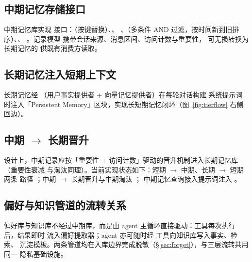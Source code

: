\subsection{中期记忆存储接口}

中期记忆库实现  接口：（按键替换）、、
、（多条件 AND 过滤，按时间新到旧排序）、、
。记录模型  携带会话来源、消息区间、访问计数与重要性，
可无损转换为长期记忆的  供既有消费方读取。

\subsection{长期记忆注入短期上下文}

长期记忆经 （用户事实提供者 + 向量记忆提供者）在每轮对话构建
系统提示词时注入「Persistent Memory」区块，实现长短期记忆闭环（图~\ref{fig:tierflow}
右侧回边）。

\subsection{中期 $\rightarrow$ 长期晋升}

设计上，中期记录应按「重要性 + 访问计数」驱动的晋升机制进入长期记忆库（重要性衰减
与淘汰同理）。当前实现状态如下：短期 $\rightarrow$ 中期、长期 $\rightarrow$ 短期两条
路径 \statusdone；中期 $\rightarrow$ 长期晋升与中期淘汰 ；
中期记忆查询接入提示词注入 。

\subsection{偏好与知识管道的流转关系}

偏好库与知识库不经过中期库，而是由 agent 主循环直接驱动：工具每次执行后，结果即时
流入偏好提取器；agent 亦可随时经  工具向知识库写入事实、检索、
沉淀模板。两条管道均在入库边界完成脱敏（\S\ref{sec:forget}），与三层流转共用同一
隐私基础设施。
